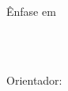 \begin{titlepage}
\begin{center}

{\large \textbf{\universidade}}\\
\vspace{0.25cm}
{\large \programa}\\
{\large Ênfase em \area}

\vfill

{\Large \textbf{\tituloDissertacao}}

\ifx\subtituloDissertacao\empty
\else
\\[0.3cm]{\large \subtituloDissertacao}
\fi

\vfill

{\large \autora}\\[0.3cm]
{\large Orientador: \orientadorDissertacao}

\vfill

{\large \localDissertacao}\\
{\large \anoDissertacao}

\end{center}
\end{titlepage}
